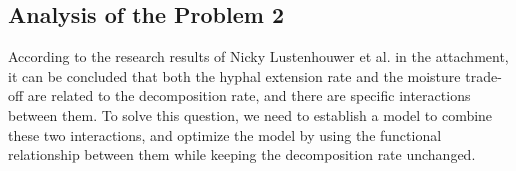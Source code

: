\subsection{Analysis of the Problem 2}
According to the research results of Nicky Lustenhouwer et al. in the attachment, it can be concluded that both the hyphal extension rate and the moisture trade-off are related to the decomposition rate, and there are specific interactions between them. To solve this question, we need to establish a model to combine these two interactions, and optimize the model by using the functional relationship between them while keeping the decomposition rate unchanged.
